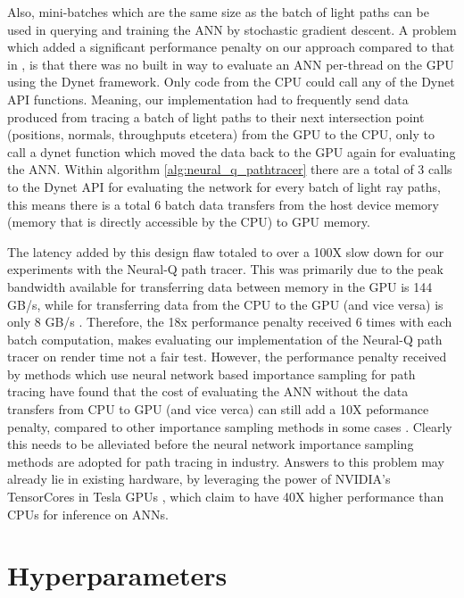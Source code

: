 \documentclass[../dissertation.tex]{subfiles}
\begin{document}
Also, mini-batches which are the same size as the batch of light paths can be used in querying and training the ANN by stochastic gradient descent. A problem which added a significant performance penalty on our approach compared to that in \cite{muller2018neural}, is that there was no built in way to evaluate an ANN per-thread on the GPU using the Dynet framework. Only code from the CPU could call any of the Dynet API functions. Meaning, our implementation had to frequently send data produced from tracing a batch of light paths to their next intersection point (positions, normals, throughputs etcetera) from the GPU to the CPU, only to call a dynet function which moved the data back to the GPU again for evaluating the ANN. Within algorithm \ref{alg:neural_q_pathtracer} there are a total of $3$ calls to the Dynet API for evaluating the network for every batch of light ray paths, this means there is a total $6$ batch data transfers from the host device memory (memory that is directly accessible by the CPU) to GPU memory.

The latency added by this design flaw totaled to over a 100X slow down for our experiments with the Neural-Q path tracer. This was primarily due to the peak bandwidth available for transferring data between memory in the GPU is 144 GB/s, while for transferring data from the CPU to the GPU (and vice versa) is only 8 GB/s \cite{global_data_transfer}. Therefore, the 18x performance penalty received $6$ times with each batch computation, makes evaluating our implementation of the Neural-Q path tracer on render time not a fair test. However, the performance penalty received by methods which use neural network based importance sampling for  path tracing have found that the cost of evaluating the ANN without the data transfers from CPU to GPU (and vice verca) can still add a 10X peformance penalty, compared to other importance sampling methods in some cases \cite{muller2018neural, keller2019integral}. Clearly this needs to be alleviated before the neural network importance sampling methods are adopted for path tracing in industry. Answers to this problem may already lie in existing hardware, by leveraging the power of NVIDIA's TensorCores in Tesla GPUs \cite{tensor_cores}, which claim to have 40X higher performance than CPUs for inference on ANNs.

\section{Hyperparameters}
\end{document}
